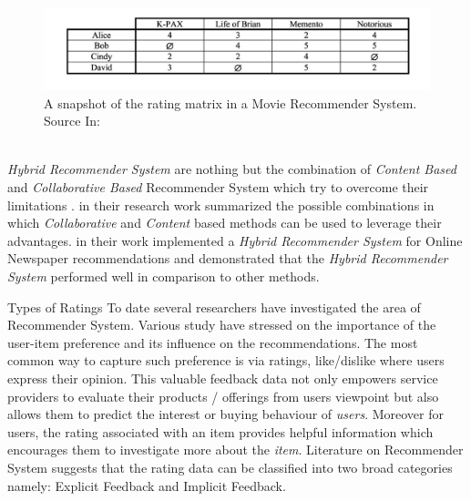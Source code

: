 \begin{figure}
    \centering
\includegraphics[scale=0.5]{chapters/figures/Rating Matrix.png}
    \caption{A snapshot of the rating matrix in a Movie Recommender System.  \\
    Source In: \textcite[735]{Adomavicius2005}}
    \label{fig:rating_matrix}
\end{figure}

\\

\emph{Hybrid Recommender System} are nothing but the combination of \emph{Content Based} and \emph{Collaborative Based} Recommender System which try to overcome their limitations \autocite[2]{Claypool1999CombiningCA}.\textcite[740]{Adomavicius2005} in their research work summarized the possible combinations in which \emph{Collaborative} and \emph{Content} based methods can be used to leverage their advantages. \textcite[5]{Claypool1999CombiningCA} in their work implemented a \emph{Hybrid Recommender System} for Online Newspaper recommendations and demonstrated that the \emph{Hybrid Recommender System} performed well in comparison to other methods. \\ \par

Types of Ratings
To date several researchers have investigated the area of Recommender System. Various study have stressed on the importance of the user-item preference and its influence on the recommendations. The most common way to capture such preference is via ratings, like/dislike  where users express their opinion. This valuable feedback data not only empowers service providers to evaluate their products / offerings from users viewpoint but also allows them to predict the interest or buying behaviour of \emph{users}. Moreover for users, the rating associated with an item provides helpful information which encourages them to investigate more about the \emph{item}. Literature on Recommender System suggests that the rating data can be classified into two broad categories namely: Explicit Feedback and Implicit Feedback\autocite[796]{Lak2014}.


